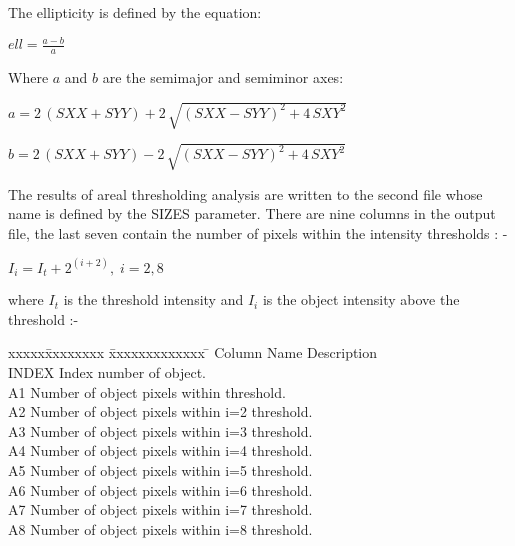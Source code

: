 The ellipticity is defined by the equation:
\begin{center}
\begin{math}
ell = \frac{a-b}{a}
\end{math}
\end{center}
Where $a$ and $b$ are the semimajor and semiminor axes:
\begin{center}
\begin{math}
a = 2\,(SXX + SYY) +2\,\sqrt{(SXX - SYY)^{2} +4\,SXY^{2}}
\end{math}
\end{center}
\begin{center}
\begin{math}
b = 2\,(SXX + SYY) -2\,\sqrt{(SXX - SYY)^{2} +4\,SXY^{2}}
\end{math}
\end{center}

The results of areal thresholding analysis are written to the second
file whose  name is defined by the SIZES parameter.  There are nine
columns in the output file, the last seven contain the number of pixels
within the intensity thresholds : -
\begin{center}
\begin{math}
     I_{i} = I_{t} + 2^{(i+2)},\; i=2,8
\end{math}
\end{center}
where $I_{t}$ is the threshold intensity and $I_{i}$ is the object
intensity above the threshold :-

\begin{center}
\begin{tabbing}
xxxxx\=xxxxxxxx \= xxxxxxxxxxxxx \= \kill
\>Column \> Name  \> Description \\
 \> INDEX \> Index number of object.\\
 \> A1 \> Number of object pixels within threshold.\\
 \> A2 \> Number of object pixels within i=2 threshold.\\
 \> A3 \> Number of object pixels within i=3 threshold.\\
 \> A4 \> Number of object pixels within i=4 threshold.\\
 \> A5 \> Number of object pixels within i=5 threshold.\\
 \> A6 \> Number of object pixels within i=6 threshold.\\
 \> A7 \> Number of object pixels within i=7 threshold.\\
 \> A8 \> Number of object pixels within i=8 threshold.\\
\end{tabbing}
\end{center}

